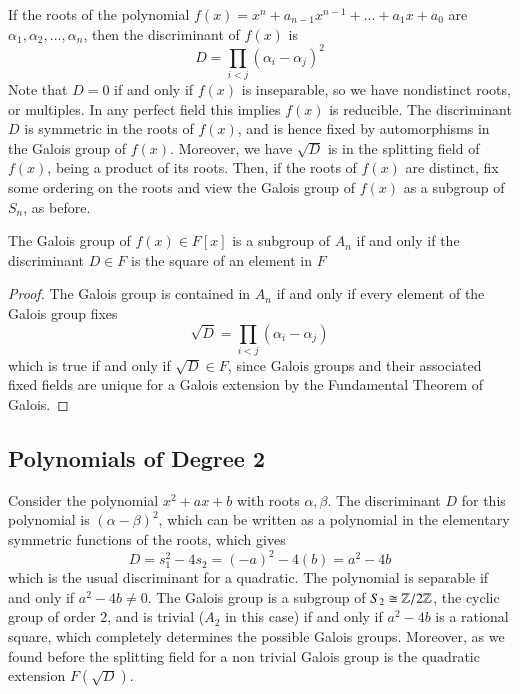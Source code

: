 If the roots of the polynomial $f(x) = x^n + a_{n-1}x^{n-1} + ...+a_1x+ a_0$ are $\alpha_1,\alpha_2,...,\alpha_n$, then the discriminant of $f(x)$ is \begin{equation*}
    D = \prod_{i < j}(\alpha_i - \alpha_j)^2
\end{equation*}
Note that $D = 0$ if and only if $f(x)$ is inseparable, so we have nondistinct roots, or multiples. In any perfect field this implies $f(x)$ is reducible. The discriminant $D$ is symmetric in the roots of $f(x)$, and is hence fixed by automorphisms in the Galois group of $f(x)$. Moreover, we have $\sqrt{D}$ is in the splitting field of $f(x)$, being a product of its roots. Then, if the roots of $f(x)$ are distinct, fix some ordering on the roots and view the Galois group of $f(x)$ as a subgroup of $S_n$, as before.

\begin{proposition}
    The Galois group of $f(x) \in F[x]$ is a subgroup of $A_n$ if and only if the discriminant $D \in F$ is the square of an element in $F$
\end{proposition}
\begin{proof}
    The Galois group is contained in $A_n$ if and only if every element of the Galois group fixes \begin{equation*}
        \sqrt{D} = \prod_{i < j}(\alpha_i - \alpha_j)
    \end{equation*}
    which is true if and only if $\sqrt{D} \in F$, since Galois groups and their associated fixed fields are unique for a Galois extension by the Fundamental Theorem of Galois.
\end{proof}


\subsection{Polynomials of Degree 2}

Consider the polynomial $x^2+ax+b$ with roots $\alpha,\beta$. The discriminant $D$ for this polynomial is $(\alpha-\beta)^2$, which can be written as a polynomial in the elementary symmetric functions of the roots, which gives $$D = s_1^2-4s_2 = (-a)^2-4(b) = a^2-4b$$
which is the usual discriminant for a quadratic. The polynomial is separable if and only if $a^2-4b \neq 0$. The Galois group is a subgroup of $S_2 \cong \mathbb Z/2\mathbb Z$, the cyclic group of order $2$, and is trivial ($A_2$ in this case) if and only if $a^2-4b$ is a rational square, which completely determines the possible Galois groups. Moreover, as we found before the splitting field for a non trivial Galois group is the quadratic extension $F(\sqrt{D})$.


